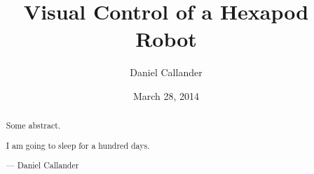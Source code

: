 \documentclass{l4proj}
\begin{document}
\title{Visual Control of a Hexapod Robot}
\author{Daniel Callander}
\date{March 28, 2014}
\maketitle


\begin{abstract}
Some abstract.
\end{abstract}

\renewcommand{\abstractname}{Acknowledgements}
\begin{abstract}
I am going to sleep for a hundred days.

--- Daniel Callander
\end{abstract}

\educationalconsent
\tableofcontents

 








\renewcommand{\bibname}{References}


\end{document}
